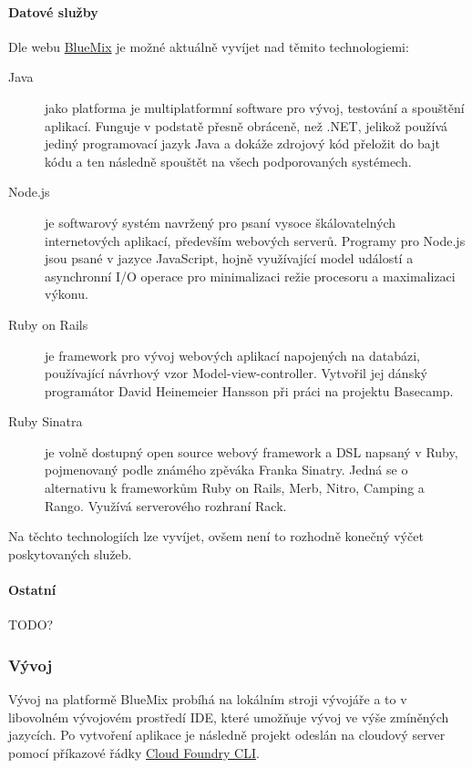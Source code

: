 \paragraph{Datové služby}
Dle webu \href{https://ace.ng.bluemix.net}{BlueMix}\cite{bluemix:web} je možné aktuálně vyvíjet nad těmito technologiemi:
\begin{description}
	\item [Java] jako platforma je multiplatformní software pro vývoj, testování a spouštění aplikací. Funguje v podstatě přesně obráceně, než .NET, jelikož používá jediný programovací jazyk Java a dokáže zdrojový kód přeložit do bajt kódu a ten následně spouštět na všech podporovaných systémech.
	\item [Node.js] je softwarový systém navržený pro psaní vysoce škálovatelných internetových aplikací, především webových serverů. Programy pro Node.js jsou psané v jazyce JavaScript, hojně využívající model událostí a asynchronní I/O operace pro minimalizaci režie procesoru a maximalizaci výkonu.\cite{wiki:node.js}
	\item [Ruby on Rails] je framework pro vývoj webových aplikací napojených na databázi, používající návrhový vzor Model-view-controller. Vytvořil jej dánský programátor David Heinemeier Hansson při práci na projektu Basecamp.\cite{wiki:rails}
	\item [Ruby Sinatra] je volně dostupný open source webový framework a DSL napsaný v Ruby, pojmenovaný podle známého zpěváka Franka Sinatry. Jedná se o alternativu k frameworkům Ruby on Rails, Merb, Nitro, Camping a Rango. Využívá serverového rozhraní Rack.\cite{wiki:sinatra}
\end{description}
Na těchto technologiích lze vyvíjet, ovšem není to rozhodně konečný výčet poskytovaných služeb.

\paragraph{Ostatní}
TODO?

\subsubsection{Vývoj}
Vývoj na platformě BlueMix probíhá na lokálním stroji vývojáře a to v libovolném vývojovém prostředí IDE, které umožňuje vývoj ve výše zmíněných jazycích. Po vytvoření aplikace je následně projekt odeslán na cloudový server pomocí příkazové řádky \href{https://github.com/cloudfoundry/cli}{Cloud Foundry CLI}.

